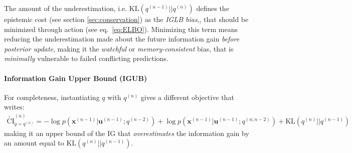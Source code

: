 \documentclass[12pt,twoside,openright]{article}
\begin{document}
{\color{Purple} The amount of the} underestimation, {\color{Purple} i.e. $\text{KL} (q^{(n-1)}||q^{(n)})$} {\color{Purple} defines the epistemic cost (see section \ref{sec:conservation}) as the \emph{IGLB bias},}, that should be minimized through action (see eq.~\ref{eq:ELBO}). Minimizing this term means reducing the underestimation made about the future information gain \emph{before posterior update}, making it the \emph{watchful} or \emph{memory-consistent} bias, that is \emph{minimally} vulnerable to failed conflicting predictions.



\paragraph{Information Gain Upper Bound (IGUB)}
{\color{Purple}For completeness, } instantiating $q$ with $q^{(n)}$ gives a different objective  that writes:
\begin{align}
	\tilde{\text{CI}}^{(n)}_{q = q^{(n)}} = 
	-\log p(\boldsymbol{x}^{(n-1)}|\boldsymbol{u}^{(n-1)}; q^{(n-2)}) 
	+ \log p(\boldsymbol{x}^{(n-1)}|\boldsymbol{u}^{(n-1)}; q^{(n;n-2)}) + \text{KL} (q^{(n)}||q^{(n-1)})
\end{align}
making it {\color{Purple} an upper bound of the IG that} \emph{overestimates} the information gain by an amount equal to $\text{KL} (q^{(n)}||q^{(n-1)})$. 
\end{document}
